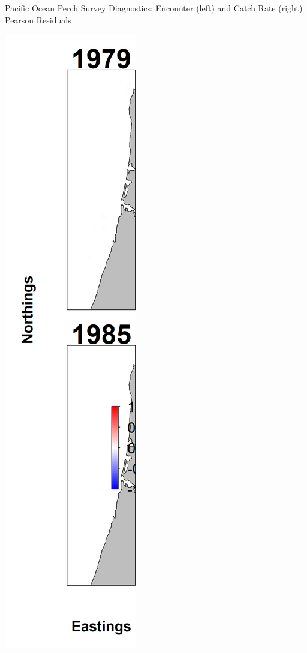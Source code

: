 \documentclass[pdf]{beamer}\usepackage[]{graphicx}\usepackage[]{color}
\begin{document}
\begin{frame}{Pacific Ocean Perch Survey Diagnostics: Encounter (left) and Catch Rate (right) Pearson Residuals}
  \begin{center}
  \includegraphics[scale = 0.23]{figures/POP_maps--encounter_pearson_resid.png}

\end{center}
\end{frame}
\end{document}
